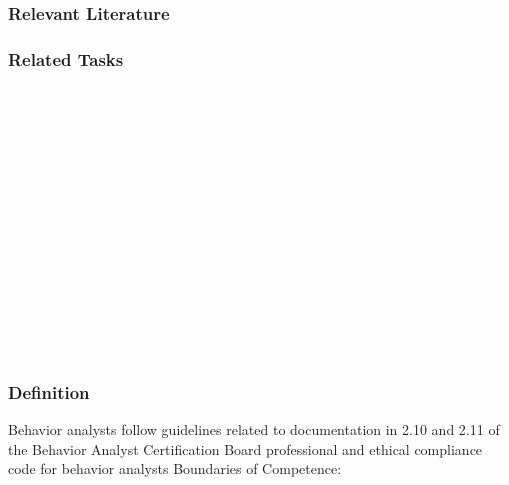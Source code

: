 \subsection{Relevant Literature}
\begin{refsection}
\nocite{test,alang2017police,clayton2018black}
\printbibliography[heading=none]
\end{refsection}
%
\subsection{Related Tasks}
\fouraTen{}\\
\fouraEleven{}\\
\fouraTwelve{}\\
\fouraFourteen{}\\
\fourbThree{}\\
\fourhOne{}\\
\fourhThree{}\\
\fourhFour{}\\
\fouriFive{}\\
\fouriSeven{}\\
\fourjOne{}\\
\fourkFour{}\\
\fourFKThirtyThree{}\\
%
%
%
%
%
%
%
%
\chapter{\fourseck{}}
%
\section[\fourkOne{}]{\fourkOne{}%
              }
\subsection{Definition}
Behavior analysts follow guidelines related to documentation in 2.10 and 2.11 of the Behavior Analyst Certification Board professional and ethical compliance code for behavior analysts Boundaries of Competence:

